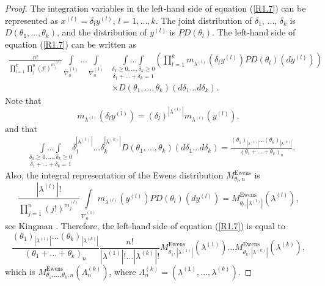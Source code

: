 \documentclass[12pt]{amsart}
\theoremstyle{definition}
\numberwithin{equation}{section}
\DeclareMathOperator{\Ewens}{Ewens}
\begin{document}
\begin{proof}The integration variables in the left-hand side of equation (\ref{R1.7}) can be represented as $x^{(l)}=\delta_ly^{(l)}$, $l=1,\ldots,k$.  The joint distribution of $\delta_1$, $\ldots$, $\delta_k$ is $D\left(\theta_1,\ldots,\theta_k\right)$,
and the distribution of $y^{(l)}$ is $PD(\theta_l)$. The left-hand side of equation (\ref{R1.7}) can be written as
\begin{equation}
\begin{split}
\frac{n!}{\prod_{l=1}^k\prod_j^n(j!)^{m_j^{(l)}}}
\int\limits_{\overline{\nabla}_0^{(1)}}\ldots
\int\limits_{\overline{\nabla}_0^{(1)}}
&\underset{\delta_1+\ldots+\delta_k=1}{\underset{\delta_1\geq 0,\ldots,\delta_k\geq 0}{\int\ldots\int}}
\left(\prod\limits_{l=1}^km_{\lambda^{(l)}}\left(\delta_ly^{(l)}\right)PD\left(\theta_l\right)(dy^{(l)})\right)\\
&\times D(\theta_1,\ldots,\theta_k)\left(d\delta_1\ldots d\delta_k\right).
\end{split}
\end{equation}
Note that
\begin{equation}
m_{\lambda^{(l)}}\left(\delta_ly^{(l)}\right)=\left(\delta_l\right)^{|\lambda^{(l)}|}m_{\lambda^{(l)}}\left(y^{(l)}\right),
\end{equation}
and that
\begin{equation}
\begin{split}
&\underset{\delta_1+\ldots+\delta_k=1}{\underset{\delta_1\geq 0,\ldots,\delta_k\geq 0}{\int\ldots\int}}
\delta_1^{|\lambda^{(1)}|}\ldots\delta_k^{|\lambda^{(k)}|}D(\theta_1,\ldots,\theta_k)\left(d\delta_1\ldots d\delta_k\right)=\frac{(\theta_1)_{|\lambda^{(1)}|}\ldots(\theta_k)_{|\lambda^{(k)}|}}{(\theta_1+\ldots+\theta_k)_n}.
\end{split}
\end{equation}
Also, the integral representation of the Ewens distribution $M_{\theta_l,n}^{\Ewens}$ is
\begin{equation}
\frac{|\lambda^{(l)}|!}{\prod_{j=1}^n(j!)^{m_j^{(l)}}}
\int\limits_{\overline{\nabla}_0^{(1)}}m_{\lambda^{(l)}}\left(y^{(l)}\right)PD(\theta_l)(dy^{(l)})=M_{\theta_l,|\lambda^{(l)}|}^{\Ewens}\left(\lambda^{(l)}\right),
\end{equation}
see Kingman \cite{Kingman1}.
Therefore, the left-hand side of equation (\ref{R1.7}) is equal to
$$
\frac{(\theta_1)_{|\lambda^{(1)}|}\ldots(\theta_k)_{|\lambda^{(k)}|}}{(\theta_1+\ldots+\theta_k)_n}
\frac{n!}{|\lambda^{(1)}|!\ldots|\lambda^{(k)}|!}
M_{\theta_1,|\lambda^{(1)}|}^{\Ewens}\left(\lambda^{(1)}\right)\ldots M_{\theta_k,|\lambda^{(k)}|}^{\Ewens}\left(\lambda^{(k)}\right),
$$
which is $M_{\theta_1,\ldots,\theta_k;n}^{\Ewens}\left(\Lambda_n^{(k)}\right)$, where $\Lambda_n^{(k)}=\left(\lambda^{(1)},\ldots,\lambda^{(k)}\right)$.
\end{proof}
\end{document}
